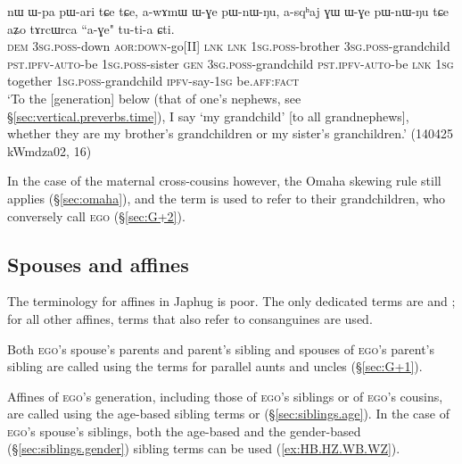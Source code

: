 \begin{exe}
\ex \label{ex:ZChCh.BChCh}
\gll nɯ ɯ-pa pɯ-ari tɕe tɕe, a-wɤmɯ ɯ-ɣe pɯ-nɯ-ŋu, a-sqʰaj ɣɯ ɯ-ɣe pɯ-nɯ-ŋu tɕe aʑo tɤrcɯrca ``a-ɣe" tu-ti-a ɕti. \\
\textsc{dem} \textsc{3sg}.\textsc{poss}-down \textsc{aor}:\textsc{down}-go[II] \textsc{lnk} \textsc{lnk} \textsc{1sg}.\textsc{poss}-brother \textsc{3sg}.\textsc{poss}-grandchild \textsc{pst}.\textsc{ipfv}-\textsc{auto}-be \textsc{1sg}.\textsc{poss}-sister \textsc{gen} \textsc{3sg}.\textsc{poss}-grandchild \textsc{pst}.\textsc{ipfv}-\textsc{auto}-be \textsc{lnk} \textsc{1sg} together \textsc{1sg}.\textsc{poss}-grandchild \textsc{ipfv}-say-\textsc{1sg} be.\textsc{aff}:\textsc{fact} \\
\glt `To the [generation] below (that of one's nephews, see §\ref{sec:vertical.preverbs.time}), I say  `my grandchild' [to all grandnephews], whether they are my brother's grandchildren or my sister's granchildren.' (140425 kWmdza02, 16)
\end{exe}

In the case of the maternal cross-cousins however, the Omaha skewing rule still applies (§\ref{sec:omaha}), and the term  is used to refer to their grandchildren, who conversely call \textsc{ego}  (§\ref{sec:G+2}).


\subsection{Spouses and affines} \label{sec:spouses}
The terminology for affines in Japhug is poor. The only dedicated terms are  and ; for all other affines, terms that also refer to consanguines are used.

Both \textsc{ego}'s spouse's parents and parent's sibling and spouses of \textsc{ego}'s parent's sibling are called using the terms for parallel aunts and uncles (§\ref{sec:G+1}).

Affines of \textsc{ego}'s generation, including those of \textsc{ego}'s siblings or of \textsc{ego}'s cousins, are called using the age-based sibling terms  or  (§\ref{sec:siblings.age}). In the case of \textsc{ego}'s spouse's siblings, both the age-based and the gender-based (§\ref{sec:siblings.gender}) sibling terms can be used (\ref{ex:HB.HZ.WB.WZ}).

